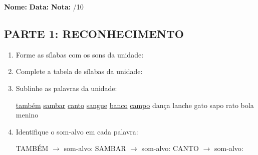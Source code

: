\begin{exercicio}

\noindent\textbf{Nome:} \underline{\hspace{3.2cm}} \quad \textbf{Data:} \underline{\hspace{1.6cm}} \quad \textbf{Nota:} \underline{\hspace{0.9cm}}/10


\subsection*{PARTE 1: RECONHECIMENTO}

\begin{enumerate}

  \item Forme as sílabas com os sons da unidade:

\begin{center}
\end{center}

  \item Complete a tabela de sílabas da unidade:

\begin{center}
\end{center}

  \item Sublinhe as palavras da unidade:

\begin{center}
  \uline{também} \quad \uline{sambar} \quad \uline{canto} \quad \uline{sangue} \quad \uline{banco} \quad \uline{campo} \quad dança \quad lanche \quad gato \quad sapo \quad rato \quad bola \quad menino
\end{center}

  \item Identifique o som-alvo em cada palavra:
  \begin{center}
  TAMBÉM $\rightarrow$ som-alvo: \underline{\hspace{1cm}} \quad SAMBAR $\rightarrow$ som-alvo: \underline{\hspace{1cm}} \quad CANTO $\rightarrow$ som-alvo: \underline{\hspace{1cm}}
  \end{center}


\end{enumerate}
\end{exercicio}
